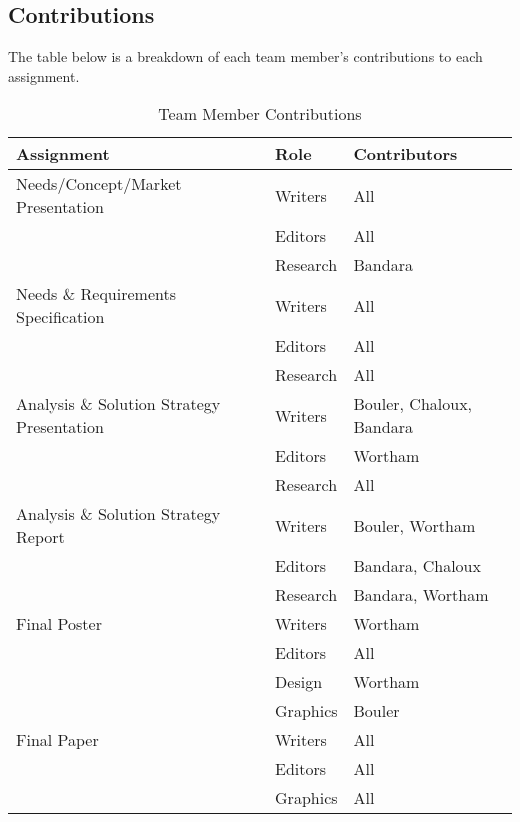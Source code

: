 \documentclass[12pt,letterpaper]{article}
\begin{document}

\clearpage
\subsection{Contributions}
The table below is a breakdown of each team member's contributions to each assignment.

\begin{table}[h!]
\begin{center}
\begin{tabular}{|l|l|l|}
\hline
\textbf{Assignment} & \textbf{Role} & \textbf{Contributors} \\
\hline

Needs/Concept/Market Presentation & Writers & All \\
\cline{2-3}
& Editors  & All \\
\cline{2-3}
& Research  & Bandara \\
\hline

Needs \& Requirements Specification & Writers & All \\
\cline{2-3}
& Editors  & All \\
\cline{2-3}
& Research  & All \\
\hline

Analysis \& Solution Strategy Presentation & Writers & Bouler, Chaloux, Bandara \\
\cline{2-3}
& Editors  & Wortham \\
\cline{2-3}
& Research  & All \\
\hline

Analysis \& Solution Strategy Report & Writers & Bouler, Wortham \\
\cline{2-3}
& Editors  & Bandara, Chaloux \\
\cline{2-3}
& Research  & Bandara, Wortham \\
\hline

Final Poster & Writers & Wortham \\
\cline{2-3}
& Editors  & All \\
\cline{2-3}
& Design	& Wortham \\
\cline{2-3}
& Graphics	& Bouler \\
\hline

Final Paper & Writers & All \\
\cline{2-3}
& Editors  & All \\
\cline{2-3}
& Graphics	& All \\
\hline
\end{tabular}
\caption{Team Member Contributions}
\end{center}
\end{table}
\end{document}
